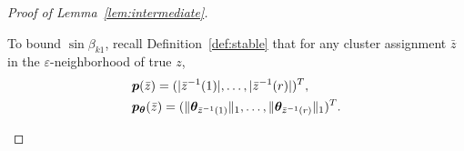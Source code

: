 \documentclass[journal]{IEEEtran}
\theoremstyle{definition}
\theoremstyle{definition}
\def\fixme#1#2{\textbf{\color{red}[FIXME (#1): #2]}}
\begin{document}
\begin{proof}[Proof of Lemma~\ref{lem:intermediate}]
\begin{enumerate}[wide]
    
    
    To bound $\sin \beta_{k1}$, recall Definition~\ref{def:stable} that for any cluster assignment $\bar z$ in the $\varepsilon$-neighborhood of true $z$,
    \begin{align}
        &\bm{p}(\bar z)=(|\bar z^{-1}(1)|, \ldots,|\bar z^{-1}(r)|)^T,\quad\\
        &\bm{p}_{\boldsymbol{\theta}}(\bar z)=(\lVert\boldsymbol{\theta}_{\bar z^{-1}(1)}\rVert_1,\ldots,\lVert\boldsymbol{\theta}_{\bar z^{-1}(r)}\rVert_1)^T.
    \end{align}
    

\end{enumerate}
\end{proof}
\end{document}
